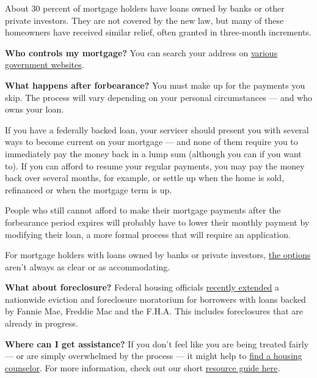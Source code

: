 About 30 percent of mortgage holders have loans owned by banks or other
private investors. They are not covered by the new law, but many of
these homeowners have received similar relief, often granted in
three-month increments.

\textbf{Who controls my mortgage?} You can search your address on
\href{https://www.consumerfinance.gov/ask-cfpb/how-can-i-tell-who-owns-my-mortgage-en-214/}{various}
\href{https://www.makinghomeaffordable.gov/get-answers/Pages/get-answers-find-out-mortgage.aspx}{government
websites}.

\textbf{What happens after forbearance?} You must make up for the
payments you skip. The process will vary depending on your personal
circumstances --- and who owns your loan.

If you have a federally backed loan, your servicer should present you
with several ways to become current on your mortgage --- and none of
them require you to immediately pay the money back in a lump sum
(although you can if you want to). If you can afford to resume your
regular payments, you may pay the money back over several months, for
example, or settle up when the home is sold, refinanced or when the
mortgage term is up.

People who still cannot afford to make their mortgage payments after the
forbearance period expires will probably have to lower their monthly
payment by modifying their loan, a more formal process that will require
an application.

For mortgage holders with loans owned by banks or private investors,
\href{https://www.nytimes.com/2020/05/15/business/coronavirus-mortgage-relief.html}{the
options} aren't always as clear or as accommodating.

\textbf{What about foreclosure?} Federal housing officials
\href{https://www.fhfa.gov/Media/PublicAffairs/Pages/FHFA-Extends-Foreclosure-and-Eviction-Moratorium-6172020.aspx}{recently
extended} a nationwide eviction and foreclosure moratorium for borrowers
with loans backed by Fannie Mae, Freddie Mac and the F.H.A. This
includes foreclosures that are already in progress.

\textbf{Where can I get assistance?} If you don't feel like you are
being treated fairly --- or are simply overwhelmed by the process --- it
might help to
\href{https://apps.hud.gov/offices/hsg/sfh/hcc/hcs.cfm}{find a housing
counselor}. For more information, check out our short
\href{https://www.nytimes.com/2020/05/15/business/covid-mortgage-forbearance.html}{resource
guide here}.

